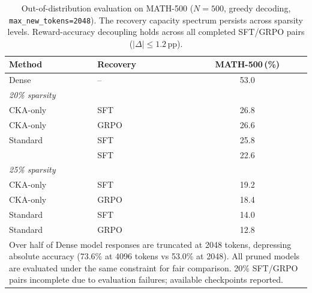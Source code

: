 \begin{table}[h]
\centering
\small
\caption{Out-of-distribution evaluation on MATH-500 ($N{=}500$, greedy decoding, \texttt{max\_new\_tokens=2048}). The recovery capacity spectrum persists across sparsity levels. Reward-accuracy decoupling holds across all completed SFT/GRPO pairs ($|\Delta| \leq 1.2$\,pp).}
\label{tab:math500}
\begin{tabular}{@{}llc@{}}
\toprule
Method & Recovery & MATH-500\,(\%) \\
\midrule
Dense & -- & 53.0 \\
\midrule
\multicolumn{3}{l}{\textit{20\% sparsity}} \\
CKA-only & SFT & 26.8 \\
CKA-only & GRPO & 26.6 \\
\midrule
Standard & SFT & 25.8 \\
\rasp{} & SFT & 22.6 \\
\midrule
\multicolumn{3}{l}{\textit{25\% sparsity}} \\
CKA-only & SFT & 19.2 \\
CKA-only & GRPO & 18.4 \\
\midrule
Standard & SFT & 14.0 \\
Standard & GRPO & 12.8 \\
\bottomrule
\multicolumn{3}{p{0.85\columnwidth}}{\footnotesize Over half of Dense model responses are truncated at 2048 tokens, depressing absolute accuracy (73.6\% at 4096 tokens vs 53.0\% at 2048). All pruned models are evaluated under the same constraint for fair comparison. 20\% SFT/GRPO pairs incomplete due to evaluation failures; available checkpoints reported.}
\end{tabular}
\end{table}
